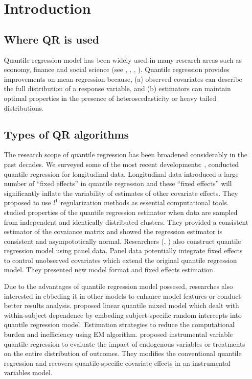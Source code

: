 \documentclass[article]{jss}
\author{
WenjingWang\\Renmin University of China \And Dianne Cook\\Monash University \And Earo Wang\\Monash University
}
\title{}
\theoremstyle{definition}
\theoremstyle{definition}
\theoremstyle{remark}
\begin{document}
\section{Introduction}\label{introduction}

\subsection{Where QR is used}\label{where-qr-is-used}

Quantile regression model has been widely used in many research areas
such as economy, finance and social science (see
\citet{autor2017effect}, \citet{mitchell2017physical},
\citet{gallego2017corporate}, \citet{maciejowska2016probabilistic}).
Quantile regression provides improvements on mean regression because,
(a) observed covariates can describe the full distribution of a response
variable, and (b) estimators can maintain optimal properties in the
presence of heteroscedasticity or heavy tailed distributions.

\subsection{Types of QR algorithms}\label{types-of-qr-algorithms}

The research scope of quantile regression has been broadened
considerably in the past decades. We surveyed some of the most recent
developments: \citet{koenker2004quantile}, \citet{geraci2006use}
conducted quantile regression for longitudinal data. Longitudinal data
introduced a large number of ``fixed effects'' in quantile regression
and these ``fixed effects'' will significantly inflate the variability
of estimates of other covariate effects. They proposed to use \(l^1\)
regularization methods as essential computational tools.
\citet{parente2016quantile} studied properties of the quantile
regression estimator when data are sampled from independent and
identically distributed clusters. They provided a consistent estimator
of the covaiance matrix and showed the regression estimator is
consistent and asympototically normal. Researchers
(\citet{galvao2011quantile}, \citet{canay2011simple}) also construct
quantile regression model using panel data. Panel data potentially
integrate fixed effects to control unobserved covariates which extend
the original quantile regression model. They presented new model format
and fixed effects estimation.

Due to the advantages of quantile regression model possesed, researches
also interested in ebbeding it in other models to enhance model features
or conduct better results analysis. \citet{geraci2014linear} proposed
linear quantile mixed model which dealt with within-subject dependence
by embeding subject-specific random intercepts into quantile regression
model. Estimation strategies to reduce the computational burden and
inefficiency using EM algorithm. \citet{chernozhukov2006instrumental}
proposed instrumental variable quantile regression to evaluate the
impact of endogenous variables or treatments on the entire distribution
of outcomes. They modifies the conventional quantile regression and
recovers quantile-specific covariate effects in an instrumental
variables model.
\end{document}

